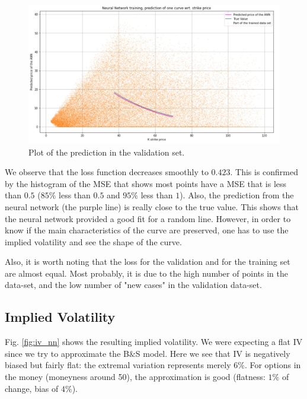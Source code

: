 \begin{figure}
\centering
\includegraphics[width = \textwidth]{../addition_part/images/NN/prediction.jpg}
\caption{Plot of the prediction in the validation set.}
\label{im:prediction}
\end{figure}





We observe that the loss function decreases smoothly to $0.423$. This is confirmed by the histogram of the MSE that shows most points have a MSE that is less than $0.5$ ($85\%$ less than $0.5$ and $95\%$ less than $1$). Also, the prediction from the neural network (the purple line) is really close to the true value. This shows that the neural network provided a good fit for a random line. However, in order to know if the main characteristics of the curve are preserved, one has to use the implied volatility and see the shape of the curve.

Also, it is worth noting that the loss for the validation and for the training set are almost equal. Most probably, it is due to the high number of points in the data-set, and the low number of "new cases" in the validation data-set.


\subsection{Implied Volatility}

Fig. \ref{fig:iv_nn} shows the resulting implied volatility. We were expecting a flat IV since we try to approximate the B$\&$S model. Here we see that IV is negatively biased but fairly flat: the extremal variation represents merely $6\%$. For options in the money (moneyness around 50), the approximation is good (flatness: $1\%$ of change, bias of $4\%$).


